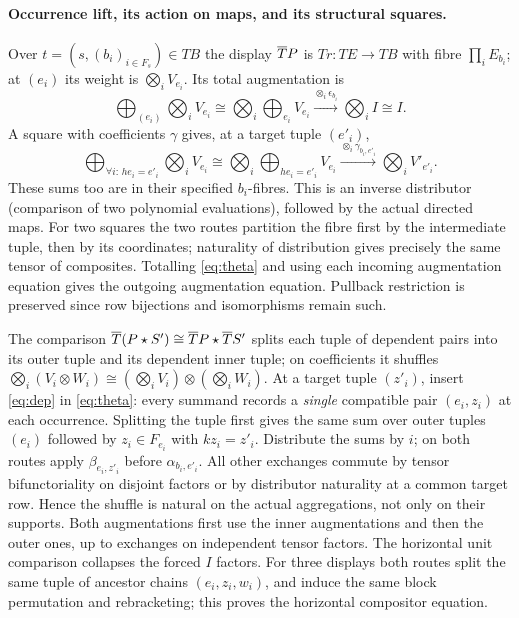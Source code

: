 \documentclass[11pt]{article}
\theoremstyle{definition}\newtheorem{definition}[theorem]{Definition}
\newcommand{\st}{\mathbin{\star}}\newcommand{\bx}{\mathop{\boxtimes}}
\begin{document}
\paragraph{Occurrence lift, its action on maps, and its structural squares.}
Over $t=(s,(b_i)_{i\in F_s})\in TB$ the display $\overline T P$ is
$Tr:TE\to TB$ with fibre $\prod_iE_{b_i}$; at $(e_i)$ its weight
is $\bigotimes_i V_{e_i}$. Its total augmentation is
\[
 \bigoplus_{(e_i)}\bigotimes_i V_{e_i}
 \cong \bigotimes_i\bigoplus_{e_i} V_{e_i}
 \xrightarrow{\otimes_i\epsilon_{b_i}}\bigotimes_i I\cong I.
\]
A square with coefficients $\gamma$ gives, at a target tuple $(e'_i)$,
\[
 \bigoplus_{\forall i:\, h e_i=e'_i}\bigotimes_i V_{e_i}
 \cong \bigotimes_i\bigoplus_{h e_i=e'_i}V_{e_i}
 \xrightarrow{\otimes_i\gamma_{b_i,e'_i}}\bigotimes_i V'_{e'_i}.
 \tag{12}\label{eq:theta}
\]
These sums too are in their specified $b_i$-fibres. This is an inverse
distributor (comparison of two polynomial evaluations), followed by
the actual directed maps. For two squares the two routes partition
the fibre first by the intermediate tuple, then by its coordinates;
naturality of distribution gives precisely the same tensor of
composites. Totalling \eqref{eq:theta} and using each incoming
augmentation equation gives the outgoing augmentation equation.
Pullback restriction is preserved since row bijections and isomorphisms
remain such.

The comparison $\Tt(P\st S')\cong\Tt P\st\Tt S'$ splits each tuple
of dependent pairs into its outer tuple and its dependent inner tuple;
on coefficients it shuffles
$\bigotimes_i(V_i\otimes W_i)\cong
(\bigotimes_i V_i)\otimes(\bigotimes_i W_i)$.
At a target tuple $(z'_i)$, insert \eqref{eq:dep} in
\eqref{eq:theta}: every summand records a \emph{single} compatible
pair $(e_i,z_i)$ at each occurrence. Splitting the tuple first gives
the same sum over outer tuples $(e_i)$ followed by
$z_i\in F_{e_i}$ with $kz_i=z'_i$. Distribute the sums by $i$;
on both routes apply $\beta_{e_i,z'_i}$ before $\alpha_{b_i,e'_i}$.
All other exchanges commute by tensor bifunctoriality on disjoint
factors or by distributor naturality at a common target row. Hence
the shuffle is natural on the actual aggregations, not only on their
supports. Both augmentations first use the inner augmentations and
then the outer ones, up to exchanges on independent tensor factors.
The horizontal unit comparison collapses the forced $I$ factors.
For three displays both routes split the same tuple of ancestor
chains $(e_i,z_i,w_i)$, and induce the same block permutation and
rebracketing; this proves the horizontal compositor equation.
\end{document}

